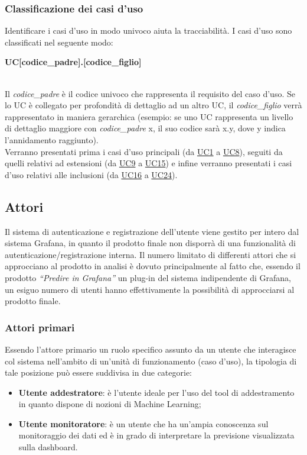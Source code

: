 \subsubsection{Classificazione dei casi d'uso}
Identificare i casi d’uso in modo univoco aiuta la tracciabilità. I casi d’uso sono classificati nel seguente modo:  \\
\centerline{\textbf{UC[codice\_padre].[codice\_figlio]}} \\ 
Il \textit{codice\_padre} è il codice univoco che rappresenta il requisito del caso d’uso. Se lo UC è collegato per profondità di dettaglio ad un altro UC, il \textit{codice\_figlio} verrà rappresentato in maniera gerarchica (esempio: se uno UC rappresenta un livello di dettaglio maggiore con \textit{codice\_padre} x, il suo codice sarà x.y, dove y indica l’annidamento raggiunto). \\ Verranno presentati prima i casi d'uso principali (da \hyperref[par:UC1]{UC1} a \hyperref[par:UC8]{UC8}), seguiti da quelli relativi ad estensioni (da \hyperref[par:UC9]{UC9} a \hyperref[par:UC15]{UC15}) e infine verranno presentati i casi d'uso relativi alle inclusioni (da \hyperref[par:UC16]{UC16} a \hyperref[par:UC24]{UC24}).

	\subsection{Attori}
Il sistema di autenticazione e registrazione dell’utente viene gestito per intero dal sistema Grafana, in quanto il prodotto finale non disporrà di una funzionalità di autenticazione/registrazione interna.
Il numero limitato di differenti attori che si approcciano al prodotto in analisi è dovuto principalmente al fatto che, essendo il prodotto \emph{“Predire in Grafana”} un plug-in del sistema indipendente di Grafana, un esiguo numero di utenti hanno effettivamente la possibilità di approcciarsi al prodotto finale.

	\subsubsection{Attori primari}
Essendo l’attore primario un ruolo specifico assunto da un utente che interagisce col sistema nell’ambito di un’unità di funzionamento (caso d’uso), la tipologia di tale posizione può essere suddivisa in due categorie:
	\begin{itemize}
		\item\textbf{Utente addestratore}: è l’utente ideale per l’uso del tool di addestramento in quanto dispone di nozioni di Machine Learning;
		\item\textbf{Utente monitoratore}: è un utente che ha un’ampia conoscenza sul monitoraggio dei dati ed è in grado di interpretare la previsione visualizzata sulla dashboard.
		
 	\end{itemize}

